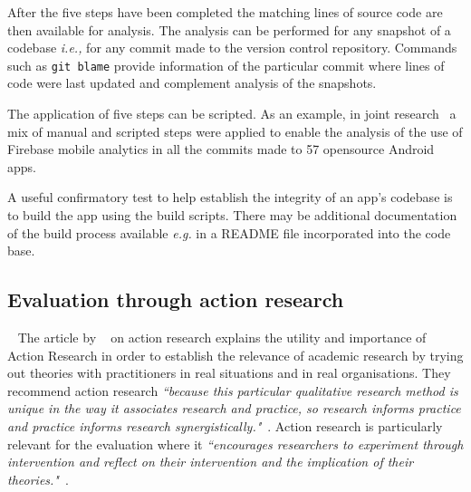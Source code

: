 After the five steps have been completed the matching lines of source code are then available for analysis. 
%
The analysis can be performed for any snapshot of a codebase \textit{i.e.,} for any commit made to the version control repository. Commands such as \texttt{git blame} provide information of the particular commit where lines of code were last updated and complement analysis of the snapshots.

The application of five steps can be scripted. As an example, in joint research~\citep{harty2021_logging_practices_arxiv} a mix of manual and scripted steps were applied to enable the analysis of the use of Firebase mobile analytics in all the commits made to 57 opensource Android apps.

A useful confirmatory test to help establish the integrity of an app's codebase is to build the app using the build scripts. There may be additional documentation of the build process available \textit{e.g.} in a README file incorporated into the code base.

\subsection{Evaluation through action research}~\label{section-evaluation-through-action-research-method}
The article by ~\citet*{avison1999_action_research} on action research explains the utility and importance of Action Research in order to establish the relevance of academic research by trying out theories with practitioners in real situations and in real organisations. They recommend action research \emph{``because this particular qualitative research method is unique in the way it associates research and practice, so research informs practice and practice informs research synergistically."}~\citep[p.94]{avison1999_action_research}. Action research is particularly relevant for the evaluation where it \emph{``encourages researchers to experiment through intervention and reflect on their intervention and the implication of their theories."}~\citep[p.95]{avison1999_action_research}. 

